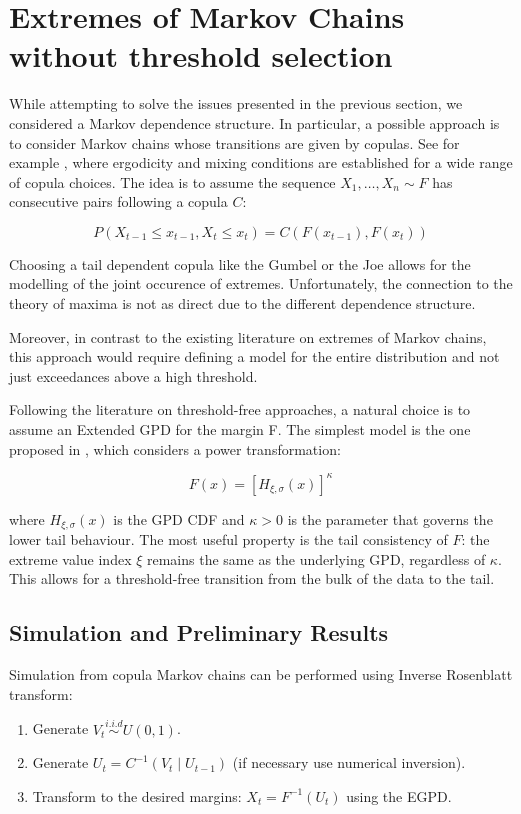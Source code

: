 \documentclass[11pt, a4paper]{article}
\begin{document}
\section{Extremes of Markov Chains without threshold selection}

While attempting to solve the issues presented in the previous section, we considered a Markov dependence structure. In particular, a possible approach is to consider Markov chains whose transitions are given by copulas. See for example \textcite{chen2009,longla2012}, where ergodicity and mixing conditions are established for a wide range of copula choices. The idea is to assume the sequence $X_1, \dots, X_n \sim F$ has consecutive pairs following a copula $C$:

\[
P(X_{t-1} \leq x_{t-1}, X_t \leq x_t) = C(F(x_{t-1}), F(x_t))
\]


Choosing a tail dependent copula like the Gumbel or the Joe allows for the modelling of the joint occurence of extremes. Unfortunately, the connection to the theory of maxima is not as direct due to the different dependence structure.

Moreover, in contrast to the existing literature on extremes of Markov chains, this approach would require defining a model for the entire distribution and not just exceedances above a high threshold.

Following the literature on threshold-free approaches, a natural choice is to assume an Extended GPD for the margin F. The simplest model is the one proposed in \textcite{naveau2016}, which considers a power transformation:

\[
F(x) = \left[ H_{\xi, \sigma}(x) \right]^\kappa
\]

where $H_{\xi, \sigma}(x)$ is the GPD CDF and $\kappa > 0$ is the parameter that governs the lower tail behaviour. The most useful property is the tail consistency of $F$: the extreme value index $\xi$ remains the same as the underlying GPD, regardless of $\kappa$. This allows for a threshold-free transition from the bulk of the data to the tail.

\subsection{Simulation and Preliminary Results}

Simulation from copula Markov chains can be performed using Inverse Rosenblatt transform:

\begin{enumerate}
    \item Generate $V_t \overset{i.i.d}{\sim} U(0,1)$.
    \item Generate $U_t = C^{-1}(V_t \mid U_{t-1})$ (if necessary use numerical inversion).
    \item Transform to the desired margins: $X_t = F^{-1}(U_t)$ using the EGPD.
\end{enumerate}
\end{document}
